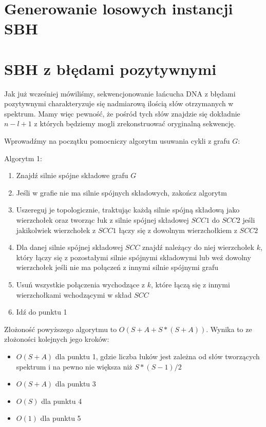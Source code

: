 \documentclass[a4paper,10pt]{article}
\begin{document}
\section{Generowanie losowych instancji SBH}


\section{SBH z błędami pozytywnymi}
Jak już wcześniej mówiliśmy, sekwencjonowanie łańcucha DNA z błędami pozytywnymi charakteryzuje się nadmiarową ilością słów otrzymanych w spektrum. Mamy więc pewność, że pośród tych słów znajdzie się dokładnie $n-l+1$ z których będziemy mogli zrekonstruować oryginalną sekwencję.

Wprowadźmy na początku pomocniczy algorytm usuwania cykli z grafu $G$:

Algorytm 1:
\begin{enumerate}
 \item Znajdź silnie spójne składowe grafu $G$
 \item Jeśli w grafie nie ma silnie spójnych składowych, zakończ algorytm
 \item Uszereguj je topologicznie, traktując każdą silnie spójną składową jako wierzchołek oraz tworząc łuk z silnie spójnej składowej $SCC1$ do $SCC2$ jeśli jakikolwiek wierzchołek z $SCC1$ łączy się z dowolnym wierzchołkiem z $SCC2$
 \item Dla danej silnie spójnej składowej $SCC$ znajdź należący do niej wierzchołek $k$, który łączy się z pozostałymi silnie spójnymi składowymi lub weź dowolny wierzchołek jeśli nie ma połączeń z innymi silnie spójnymi grafu
 \item Usuń wszystkie połączenia wychodzące z $k$, które łączą się z innymi wierzchołkami wchodzącymi w skład $SCC$
 \item Idź do punktu 1
\end{enumerate}

Złożoność powyższego algorytmu to $O(S + A + S * (S + A))$. Wynika to ze złożoności kolejnych jego kroków:
\begin{itemize}
 \item $O(S + A)$ dla punktu 1, gdzie liczba łuków jest zależna od słów tworzących spektrum i na pewno nie większa niż $S * (S-1) / 2$
 \item $O(S + A)$ dla punktu 3
 \item $O(S)$ dla punktu 4
 \item $O(1)$ dla punktu 5
\end{itemize}
\end{document}
